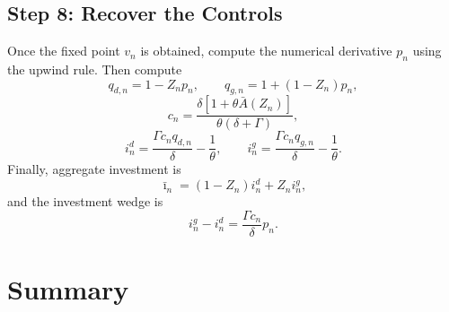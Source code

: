\documentclass[11pt]{article}
\newcommand{\Abar}{\bar A}
\newcommand{\ibar}{\bar\imath}
\begin{document}
\subsection{Step 8: Recover the Controls}

Once the fixed point $v_n$ is obtained, compute the numerical derivative $p_n$ using the upwind rule. Then compute
\begin{equation}
    q_{d,n}=1-Z_np_n,
    \qquad
    q_{g,n}=1+(1-Z_n)p_n,
\end{equation}
\begin{equation}
    c_n=\frac{\delta\left[1+\theta\Abar(Z_n)\right]}{\theta(\delta+\Gamma)},
\end{equation}
\begin{equation}
    i^d_n=\frac{\Gamma c_n q_{d,n}}{\delta}-\frac{1}{\theta},
    \qquad
    i^g_n=\frac{\Gamma c_n q_{g,n}}{\delta}-\frac{1}{\theta}.
\end{equation}
Finally, aggregate investment is
\begin{equation}
    \ibar_n=(1-Z_n)i^d_n+Z_ni^g_n,
\end{equation}
and the investment wedge is
\begin{equation}
    i^g_n-i^d_n=\frac{\Gamma c_n}{\delta}p_n.
\end{equation}

\section{Summary}
\end{document}
